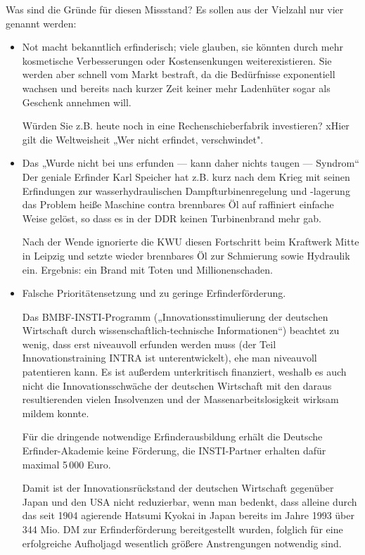 \documentclass[11pt,a4paper]{article}
\begin{document}
Was sind die Gründe für diesen Missstand?  Es sollen aus der Vielzahl nur vier
genannt werden:
\begin{itemize}
\item Not macht bekanntlich erfinderisch; viele glauben, sie könnten durch
  mehr kosmetische Verbesserungen oder Kostensenkungen weiterexistieren. Sie
  werden aber schnell vom Markt bestraft, da die Bedürfnisse exponentiell
  wachsen und bereits nach kurzer Zeit keiner mehr Ladenhüter sogar als
  Geschenk annehmen will.

  Würden Sie z.B. heute noch in eine Rechenschieberfabrik investieren? xHier
  gilt die Weltweisheit „Wer nicht erfindet, verschwindet".
  
\item Das „Wurde nicht bei uns erfunden — kann daher nichts taugen — Syndrom“
  Der geniale Erfinder Karl Speicher hat z.B. kurz nach dem Krieg mit seinen
  Erfindungen zur wasserhydraulischen Dampfturbinenregelung und -lagerung das
  Problem heiße Maschine contra brennbares Öl auf raffiniert einfache Weise
  gelöst, so dass es in der DDR keinen Turbinenbrand mehr gab.

  Nach der Wende ignorierte die KWU diesen Fortschritt beim Kraftwerk Mitte in
  Leipzig und setzte wieder brennbares Öl zur Schmierung sowie Hydraulik
  ein. Ergebnis: ein Brand mit Toten und Millionenschaden.

\item Falsche Prioritätensetzung und zu geringe Erfinderförderung.
  
  Das BMBF-INSTI-Programm („Innovationsstimulierung der deutschen Wirtschaft
  durch wissenschaftlich-technische Informationen“) beachtet zu wenig, dass
  erst niveauvoll erfunden werden muss (der Teil Innovationstraining INTRA ist
  unterentwickelt), ehe man niveauvoll patentieren kann. Es ist außerdem
  unterkritisch finanziert, weshalb es auch nicht die Innovationsschwäche der
  deutschen Wirtschaft mit den daraus resultierenden vielen Insolvenzen und
  der Massenarbeitslosigkeit wirksam mildem konnte.

  Für die dringende notwendige Erfinderausbildung erhält die Deutsche
  Erfinder-Aka\-demie keine Förderung, die INSTI-Partner erhalten dafür
  maximal 5\,000 Euro.
  
  Damit ist der Innovationsrückstand der deutschen Wirtschaft gegenüber Japan
  und den USA nicht reduzierbar, wenn man bedenkt, dass alleine durch das seit
  1904 agierende Hatsumi Kyokai in Japan bereits im Jahre 1993 über 344 Mio.
  DM zur Erfinderförderung bereitgestellt wurden, folglich für eine
  erfolgreiche Aufholjagd wesentlich größere Anstrengungen notwendig sind.


\end{itemize}
\end{document}
